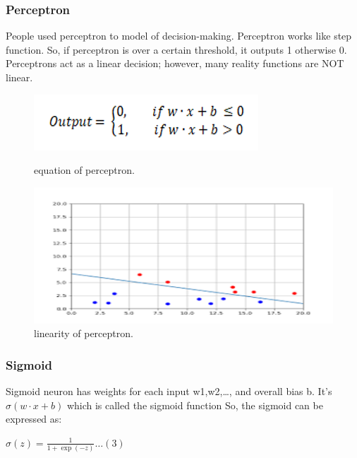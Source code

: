 \documentclass{article}
\begin{document}
\subsubsection{Perceptron}
People used perceptron to model of decision-making. Perceptron works like step function. So, if perceptron is over a certain threshold, it outputs 1 otherwise 0.
Perceptrons act as a linear decision; however, many reality functions are NOT linear.
\begin{figure}[H]
  \centering
  \begin{minipage}[b]{0.4\textwidth}
    \includegraphics[width=\textwidth]{img/percept.png}
    \caption{equation of perceptron.}
  \end{minipage}
  \hfill
  \begin{minipage}[b]{0.4\textwidth}
    \includegraphics[width=\textwidth]{img/percept2.png}
    \caption{linearity of perceptron.\protect\cite{Percept}}
  \end{minipage}
\end{figure}

\subsubsection{Sigmoid}
Sigmoid neuron has weights for each input w1,w2,\dots , and overall bias b. 
It’s $\sigma{(w \cdot x+b)}$ which is called the sigmoid function
So, the sigmoid can be expressed as:

$\sigma{(z)} =\frac{1}{1+\exp(-z)} \dots (3)$
\end{document}
